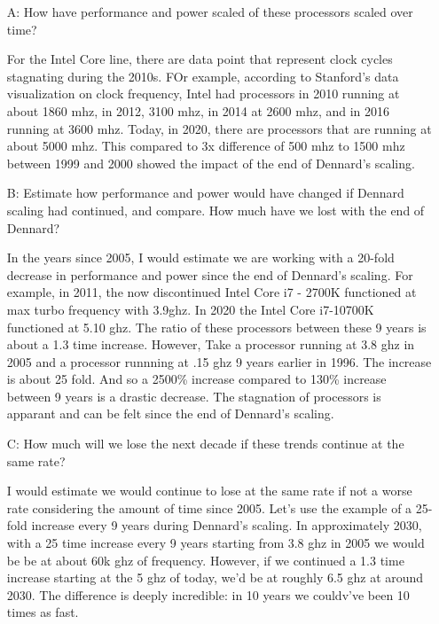 \documentclass[10pt]{article}
\begin{document}
\begin{itemize}

    \item[A:] How have performance and power scaled of these processors scaled over time?
    \item[] For the Intel Core line, there are data point that represent clock cycles stagnating during the 2010s.
    FOr example, according to Stanford's data visualization on clock frequency, Intel had processors in 2010 running at about 1860 mhz,
    in 2012, 3100 mhz, in 2014 at 2600 mhz, and in 2016 running at 3600 mhz. Today, in 2020, there are processors that are running at about 5000 mhz. 
    This compared to 3x difference of 500 mhz to 1500 mhz between 1999 and 2000 showed the impact of the end of Dennard's scaling. 
    \item[B:] Estimate how performance and power would have changed if Dennard scaling had
    continued, and compare. How much have we lost with the end of Dennard?
    \item[] In the years since 2005, I would estimate we are working with a 20-fold decrease in performance and power since the end of Dennard's scaling. For example, in 2011, the now discontinued 
    Intel Core i7 - 2700K functioned at max turbo frequency with 3.9ghz. In 2020 the Intel Core i7-10700K functioned at 5.10 ghz. The ratio of these processors between these 9 years is about a 1.3 time increase.
    However, Take a processor running at 3.8 ghz in 2005 and a processor runnning at .15 ghz 9 years earlier in 1996. The increase is about 25 fold. And so a 2500\% increase compared to 130\% increase between 
    9 years is a drastic decrease. The stagnation of processors is apparant and can be felt since the end of Dennard's scaling. 
    \item[C:] How much will we lose the next decade if these trends continue at the same rate?
    \item[] I would estimate we would continue to lose at the same rate if not a worse rate considering the amount of time since 2005.  Let's use the example of a 25-fold increase every 9 years during Dennard's scaling. 
    In approximately 2030, with a 25 time increase every 9 years starting from 3.8 ghz in 2005 we would be be at about 60k ghz of frequency. However, if we continued a 1.3 time increase starting at the 5 ghz of today, we'd be at roughly 6.5 ghz at around 2030. 
    The difference is deeply incredible: in 10 years we couldv've been 10 times as fast.  
 
\end{itemize}
\end{document}
